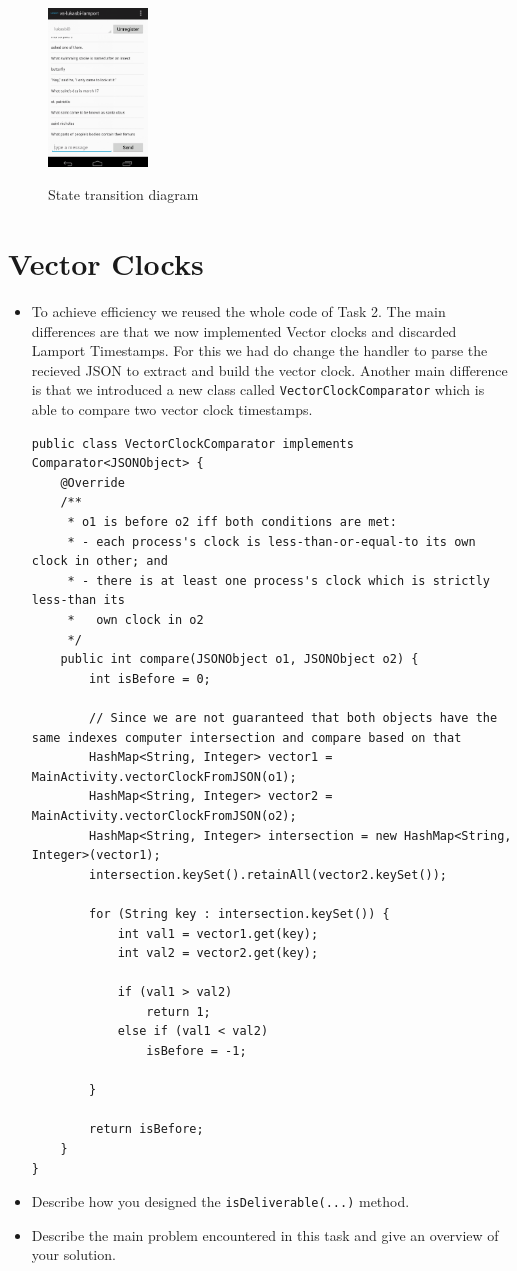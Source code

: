 \documentclass{report}
\newcommand{\lfig}[1]{\label{fig:#1}}
\begin{document}
\begin{figure}
    \centering
    \includegraphics[height=4.2cm]{std.png}
    \lfig{std}   
    \caption{State transition diagram}
\end{figure}

\section{Vector Clocks}
\begin{itemize}
  \item To achieve efficiency we reused the whole code of Task 2. The main differences are that we now implemented Vector clocks and discarded Lamport Timestamps. For this we had do change the handler to parse the recieved JSON to extract and build the vector clock. Another main difference is that we introduced a new class called \texttt{VectorClockComparator} which is able to compare two vector clock timestamps.

\begin{lstlisting}
public class VectorClockComparator implements Comparator<JSONObject> {
	@Override
	/**
     * o1 is before o2 iff both conditions are met:
     * - each process's clock is less-than-or-equal-to its own clock in other; and
     * - there is at least one process's clock which is strictly less-than its
     *   own clock in o2
     */
    public int compare(JSONObject o1, JSONObject o2) {
		int isBefore = 0;
		
		// Since we are not guaranteed that both objects have the same indexes computer intersection and compare based on that
		HashMap<String, Integer> vector1 = MainActivity.vectorClockFromJSON(o1);
		HashMap<String, Integer> vector2 = MainActivity.vectorClockFromJSON(o2);
		HashMap<String, Integer> intersection = new HashMap<String, Integer>(vector1);
		intersection.keySet().retainAll(vector2.keySet());
		
		for (String key : intersection.keySet()) {
			int val1 = vector1.get(key);
			int val2 = vector2.get(key);
			
			if (val1 > val2)
				return 1;
			else if (val1 < val2)
				isBefore = -1;
			
		}
		
		return isBefore;
	}
}
\end{lstlisting}
  \item Describe how you designed the \texttt{isDeliverable(...)} method.
  \item Describe the main problem encountered in this task and give an overview of your solution.
\end{itemize}
\end{document}
